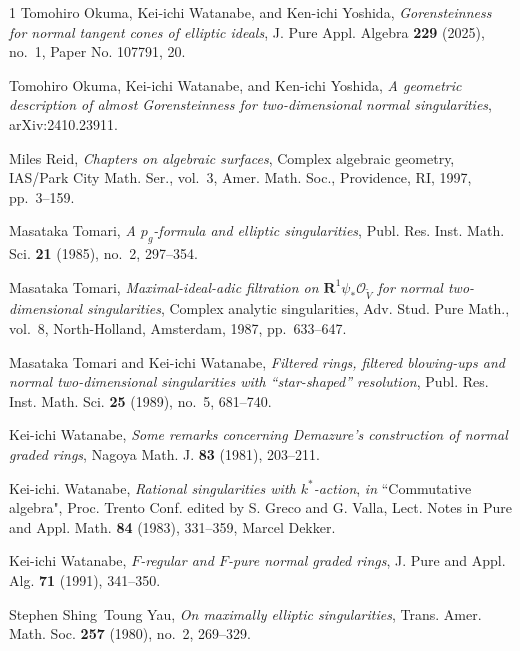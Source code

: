 \documentclass[12pt]{amsart}
\theoremstyle{definition}
\theoremstyle{remark}
\numberwithin{equation}{section}
\renewcommand{\:}{\colon}
\begin{document}
\begin{thebibliography}{1}
Tomohiro Okuma, Kei-ichi Watanabe, and Ken-ichi Yoshida,  \emph{Gorensteinness for normal tangent cones of elliptic ideals}, J.
  Pure Appl. Algebra \textbf{229} (2025), no.~1, Paper No. 107791, 20.

Tomohiro Okuma, Kei-ichi Watanabe, and Ken-ichi Yoshida, 
\emph{A geometric description of almost Gorensteinness 
for two-dimensional normal singularities}, arXiv:2410.23911.


Miles Reid, \emph{Chapters on algebraic surfaces}, Complex algebraic geometry,
  IAS/Park City Math. Ser., vol.~3, Amer. Math. Soc., Providence, RI, 1997,  pp.~3--159.

Masataka Tomari, \emph{A {$p_g$}-formula and elliptic singularities}, Publ. Res. Inst.
  Math. Sci. \textbf{21} (1985), no.~2, 297--354.

Masataka Tomari, \emph{Maximal-ideal-adic filtration on 
{${\mathbf R}^1\psi_*{\mathcal  O}_{\tilde V}$} for normal two-dimensional singularities}, Complex analytic  singularities, Adv. Stud. Pure Math., vol.~8, North-Holland, Amsterdam, 1987,
  pp.~633--647.


Masataka Tomari and Kei-ichi Watanabe, \emph{Filtered rings, filtered
  blowing-ups and normal two-dimensional singularities with ``star-shaped''
  resolution}, Publ. Res. Inst. Math. Sci. \textbf{25} (1989), no.~5, 681--740.

Kei-ichi Watanabe, \emph{Some remarks concerning {D}emazure's 
construction of normal graded rings}, Nagoya Math. J. \textbf{83} 
(1981), 203--211.

Kei-ichi. Watanabe,
\emph{Rational singularities with $k^*$-action}, {\em in}
 ``Commutative algebra", Proc. Trento Conf. edited 
 by S. Greco and G. Valla,
 Lect. Notes in Pure and Appl. Math. {\bf 84} (1983), 331--359, Marcel Dekker. 


 Kei-ichi Watanabe,  
\emph{$F$-regular and $F$-pure normal graded rings}, 
J. Pure and Appl. Alg.
{\bf 71} (1991), 341--350.


Stephen Shing~Toung Yau,  \emph{On maximally elliptic singularities}, Trans. Amer. Math. Soc.
  \textbf{257} (1980), no.~2, 269--329.
\end{thebibliography}
\end{document}
